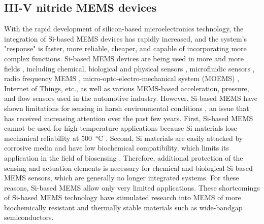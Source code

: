 \subsection{III-V nitride MEMS devices}

With the rapid development of silicon-based microelectronics technology, the integration of Si-based MEMS  devices has rapidly increased, and the system's "response" is faster, more reliable, cheaper, and capable of incorporating more complex functions. Si-based MEMS devices are being used in more and more fields \cite{ciuti2015mems}, including chemical, biological and physical sensors \cite{yabuki2014heat,wang2004ultra,khoshnoud2012recent-a,khoshnoud2012recent-b}, microfluidic sensors \cite{kottapalli2011liquid}, radio frequency MEMS \cite{fernandez2006capacitive,donelli2018exploitation}, micro-opto-electro-mechanical system (MOEMS) \cite{lee2008development,iannacci2018internet}, Internet of Things, etc., as well as various MEMS-based acceleration, pressure, and flow sensors \cite{davidson2008using,marek2011automotive,berndt2020mems} used in the automotive industry. However, Si-based MEMS have shown limitations for sensing in harsh environmental conditions \cite{french2016precision}, an issue that has received increasing attention over the past few years. First, Si-based MEMS cannot be used for high-temperature applications because Si materials lose mechanical reliability at \SI{500}{\degreeCelsius} \cite{french2016precision}. Second, Si materials are easily attacked by corrosive media and have low biochemical compatibility, which limits its application in the field of biosensing \cite{french2016precision}. Therefore, additional protection of the sensing and actuation elements is necessary for chemical and biological Si-based MEMS sensors, which are generally no longer integrated systems. For these reasons, Si-based MEMS allow only very limited applications. These shortcomings of Si-based MEMS technology have stimulated research into MEMS of more biochemically resistant and thermally stable materials such as wide-bandgap semiconductors.


